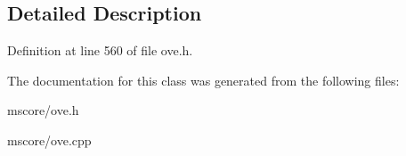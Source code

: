 \subsection{Detailed Description}


Definition at line 560 of file ove.\+h.



The documentation for this class was generated from the following files\+:\begin{DoxyCompactItemize}
\item 
mscore/ove.\+h\item 
mscore/ove.\+cpp\end{DoxyCompactItemize}
